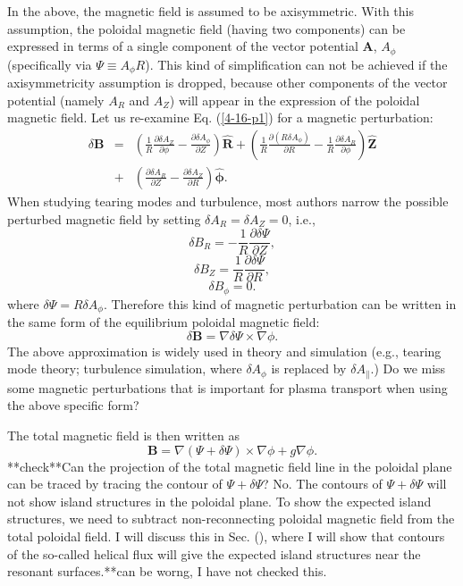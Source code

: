 \documentclass{llncs}
\newcommand{\tmmathbf}[1]{\ensuremath{\boldsymbol{#1}}}
\begin{document}
In the above, the magnetic field is assumed to be axisymmetric. With this
assumption, the poloidal magnetic field (having two components) can be
expressed in terms of a single component of the vector potential $\mathbf{A}$,
$A_{\phi}$ (specifically via $\Psi \equiv A_{\phi} R$). This kind of
simplification can not be achieved if the axisymmetricity assumption is
dropped, because other components of the vector potential (namely $A_R$ and
$A_Z$) will appear in the expression of the poloidal magnetic field. Let us
re-examine Eq. (\ref{4-16-p1}) for a magnetic perturbation:
\begin{eqnarray}
  \delta \mathbf{B} & = & \left( \frac{1}{R} \frac{\partial \delta
  A_Z}{\partial \phi} - \frac{\partial \delta A_{\phi}}{\partial Z} \right)
  \hat{\mathbf{R}} + \left( \frac{1}{R} \frac{\partial (R \delta
  A_{\phi})}{\partial R} - \frac{1}{R} \frac{\partial \delta A_R}{\partial
  \phi} \right) \hat{\mathbf{Z}} \nonumber\\
  & + & \left( \frac{\partial \delta A_R}{\partial Z} - \frac{\partial \delta
  A_Z}{\partial R} \right) \hat{\tmmathbf{\phi}} .  \label{4-16-p1m}
\end{eqnarray}
When studying tearing modes and turbulence, most authors narrow the possible
perturbed magnetic field by setting $\delta A_R = \delta A_Z = 0$, i.e.,
\begin{equation}
  \delta B_R = - \frac{1}{R} \frac{\partial \delta \Psi}{\partial Z},
\end{equation}
\begin{equation}
  \delta B_Z = \frac{1}{R} \frac{\partial \delta \Psi}{\partial R},
\end{equation}
\begin{equation}
  \delta B_{\phi} = 0.
\end{equation}
where $\delta \Psi = R \delta A_{\phi}$. Therefore this kind of magnetic
perturbation can be written in the same form of the equilibrium poloidal
magnetic field:
\begin{equation}
  \delta \mathbf{B}= \nabla \delta \Psi \times \nabla \phi .
\end{equation}
The above approximation is widely used in theory and simulation (e.g., tearing
mode theory; turbulence simulation, where $\delta A_{\phi}$ is replaced by
$\delta A_{\parallel}$.) Do we miss some magnetic perturbations that is
important for plasma transport when using the above specific form?

The total magnetic field is then written as
\begin{equation}
  \mathbf{B}= \nabla (\Psi + \delta \Psi) \times \nabla \phi + g \nabla \phi .
\end{equation}
**check**Can the projection of the total magnetic field line in the poloidal
plane can be traced by tracing the contour of $\Psi + \delta \Psi$? No. The
contours of $\Psi + \delta \Psi$ will not show island structures in the
poloidal plane. To show the expected island structures, we need to subtract
non-reconnecting poloidal magnetic field from the total poloidal field. I will
discuss this in Sec. (), where I will show that contours of the so-called
helical flux will give the expected island structures near the resonant
surfaces.**can be worng, I have not checked this.
\end{document}
